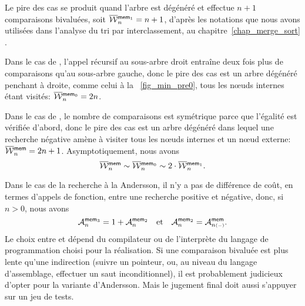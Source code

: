 Le pire des cas se produit quand l'arbre est dégénéré et  effectue \(n+1\)
comparaisons bivaluées, soit \(\OW{\fun{mem}_1}{n} = n +
1\), d'après les notations que nous
avons utilisées dans l'analyse du tri par interclassement, au chapitre~\ref{chap_merge_sort}
.

Dans le cas de , l'appel récursif au sous-arbre droit
entraîne deux fois plus de comparaisons qu'au sous-arbre gauche, donc
le pire des cas est un arbre dégénéré penchant à droite, comme celui à
la \fig~\vref{fig_min_pre0}, tous les n{\oe}uds internes étant
visités: \(\OW{\fun{mem}_0}{n} = 2n\).

Dans le cas de , le nombre de comparaisons est symétrique
parce que l'égalité est vérifiée d'abord, donc le pire des cas est un
arbre dégénéré dans lequel une recherche négative amène à visiter tous
les n{\oe}uds internes et un n{\oe}ud externe: \(\OW{\fun{mem}}{n} =
2n + 1\). Asymptotiquement, nous avons
\begin{equation*}
\OW{\fun{mem}}{n} \sim \OW{\fun{mem}_0}{n} 
\sim 2 \cdot \OW{\fun{mem}_1}{n}.
\end{equation*}

Dans le cas de la recherche à la Andersson, il n'y a pas de différence
de coût, en termes d'appels de fonction, entre une recherche positive
et négative, donc, si \(n > 0\), nous avons
\begin{equation}
\M{\fun{mem}_3}{n} = 1 + \M{\fun{mem}_2}{n}\quad\text{et}\quad
\M{\fun{mem}_2}{n} = \M{\fun{mem}}{n{\scriptscriptstyle (-)}}.
\label{eq_Andersson_average}
\index{mem3@$\M{\fun{mem}_3}{n}$}\index{mem2@$\M{\fun{mem}_2}{n}$}
\end{equation}
Le choix entre  et  dépend du
compilateur ou de l'interprète du langage de programmation choisi pour
la réalisation. Si une comparaison bivaluée est plus lente qu'une
indirection (suivre un pointeur, ou, au niveau du langage
d'assemblage, effectuer un saut inconditionnel), il est probablement
judicieux d'opter pour la variante d'Andersson. Mais le jugement final
doit aussi s'appuyer sur un jeu de tests.

